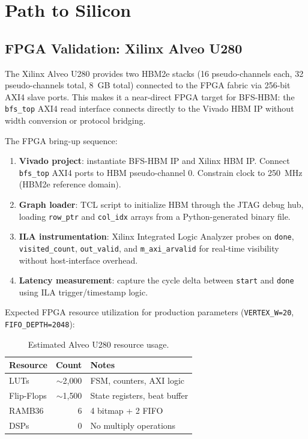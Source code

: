 \section{Path to Silicon}
\label{sec:silicon}

\subsection{FPGA Validation: Xilinx Alveo U280}

The Xilinx Alveo U280 provides two HBM2e stacks (16 pseudo-channels each, 32
pseudo-channels total, 8~GB total) connected to the FPGA fabric via 256-bit
AXI4 slave ports. This makes it a near-direct FPGA target for BFS-HBM:
the \texttt{bfs\_top} AXI4 read interface connects directly to the Vivado HBM IP
without width conversion or protocol bridging.

The FPGA bring-up sequence:
\begin{enumerate}[leftmargin=*,itemsep=2pt]
\item \textbf{Vivado project}: instantiate BFS-HBM IP and Xilinx HBM IP.
  Connect \texttt{bfs\_top} AXI4 ports to HBM pseudo-channel 0.
  Constrain clock to 250~MHz (HBM2e reference domain).
\item \textbf{Graph loader}: TCL script to initialize HBM through the JTAG
  debug hub, loading \texttt{row\_ptr} and \texttt{col\_idx} arrays from a
  Python-generated binary file.
\item \textbf{ILA instrumentation}: Xilinx Integrated Logic Analyzer probes on
  \texttt{done}, \texttt{visited\_count}, \texttt{out\_valid}, and
  \texttt{m\_axi\_arvalid} for real-time visibility without host-interface overhead.
\item \textbf{Latency measurement}: capture the cycle delta between \texttt{start}
  and \texttt{done} using ILA trigger/timestamp logic.
\end{enumerate}

Expected FPGA resource utilization for production parameters
(\texttt{VERTEX\_W=20}, \texttt{FIFO\_DEPTH=2048}):

\begin{table}[h]
\centering
\caption{Estimated Alveo U280 resource usage.}
\label{tab:fpga_resources}
\small
\begin{tabular}{@{}lrl@{}}
\toprule
Resource & Count & Notes \\
\midrule
LUTs        & $\sim$2{,}000 & FSM, counters, AXI logic \\
Flip-Flops  & $\sim$1{,}500 & State registers, beat buffer \\
RAMB36      & 6             & 4 bitmap + 2 FIFO \\
DSPs        & 0             & No multiply operations \\
\bottomrule
\end{tabular}
\end{table}

